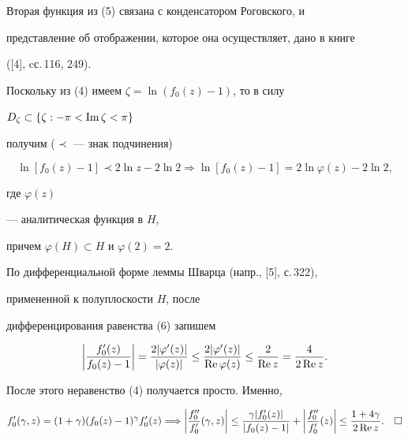  


Вторая функция из (5) связана с конденсатором Роговского, и 


представление об отображении, которое она осуществляет, дано в книге 


([4], cс.\,116, 249). 


 


Поскольку из (4) имеем  $\zeta=\ln(f_0(z)-1)$, то в силу 


$D_{\zeta}\subset \{\zeta: -\pi<\operatorname{Im} \zeta<\pi\}$ 


получим ($\prec$ --- знак подчинения) 


\begin{equation} 


\ln[f_0(z)-1]\prec 2\ln z-2\ln 2\Longrightarrow 


\ln[f_0(z)-1]=2\ln\varphi(z)-2\ln 2, 


\end{equation} 


где $\varphi(z)$ 


--- аналитическая функция в $H$, 


причем $\varphi(H)\subset H$ и $\varphi(2)=2$. 


По дифференциальной форме леммы Шварца (напр., [5], с.\,322), 


примененной к полуплоскости $H$, после 


дифференцирования равенства (6) запишем 


$$ 


\bigg|\frac{f'_0(z)}{f_0(z)-1}\bigg|= 


\frac{2|\varphi'(z)|}{|\varphi(z)|}\le 


\frac{2|\varphi'(z)|}{\re\varphi(z)}\le 


\frac{2}{\re z}=\frac{4}{2\re z}. 


$$ 


После этого неравенство (4) получается просто. Именно, 


$$ 


f'_0(\gamma,z)=(1+\gamma)(f_0(z)-1)^\gamma f'_0(z) 


\Longrightarrow 


\bigg|\frac{f''_0}{f'_0}(\gamma,z)\bigg|\le 


\frac{\gamma|f'_0(z)|}{|f_0(z)-1|}+\bigg| 


\frac{f''_0}{f'_0}(z)\bigg|\le\frac{1+4\gamma}{2\re z}. 


\quad\square 


$$ 


